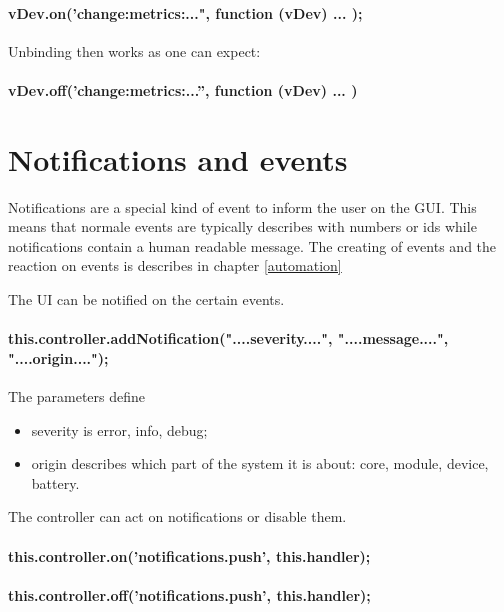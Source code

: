 \paragraph{vDev.on('change:metrics:...", function (vDev) { ... });}

Unbinding then works as one can expect:

\paragraph{vDev.off(’change:metrics:...”, function (vDev) ... )} 


\section{Notifications and events}

Notifications are a special 
kind of event to inform the user on the GUI. This means that normale events are typically
describes with numbers or ids while notifications contain a human readable message. 
The creating of events and the reaction on events is describes in chapter \ref{automation}
 
The UI can be notified on the certain events.

\paragraph{this.controller.addNotification("....severity....", "....message....", "....origin....");} 

The parameters define
\begin{itemize}
\item severity is error, info, debug; 
\item origin describes which part of the system it is about: core, module, device, battery.
\end{itemize}

The controller can act on  notifications or disable them.

\paragraph{this.controller.on('notifications.push', this.handler);}
\paragraph{this.controller.off('notifications.push', this.handler);}



 


 

